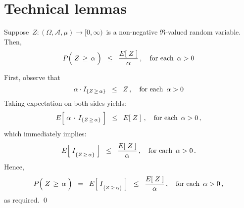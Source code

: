 

\section{Technical lemmas}
\setcounter{theorem}{0}
\setcounter{equation}{0}


\renewcommand{\theenumi}{\roman{enumi}}
\renewcommand{\labelenumi}{\textnormal{(\theenumi)}$\;\;$}


\begin{lemma}
\label{lemma:MarkovInequality}
\mbox{}\vskip 0.2cm
\noindent
Suppose \,$Z : (\Omega,\mathcal{A},\mu) \longrightarrow [0,\infty)$\,
is a non-negative $\Re$-valued random variable.
Then,
\begin{equation*}
P\!\left(\; Z \,\overset{{\color{white}.}}{\geq}\, \alpha \;\right)
\;\; \leq \;\;
	\dfrac{ E\!\left[\; Z \;\right] }{ \alpha }\,,
\quad
\textnormal{for each \,$\alpha > 0$}
\end{equation*}
\end{lemma}
\proof
First, observe that
\begin{equation*}
\alpha \cdot I_{\{Z \,\geq\, \alpha\}} \;\; \leq \;\; Z\,,
\quad
\textnormal{for each \,$\alpha > 0$}
\end{equation*}
Taking expectation on both sides yields:
\begin{equation*}
E\!\left[\; \alpha \overset{{\color{white}-}}{\cdot} I_{\{Z \,\geq\, \alpha\}} \;\right]
\;\; \leq \;\;
	E\!\left[\; Z \;\right]\,,
\quad
\textnormal{for each \,$\alpha > 0$}\,,
\end{equation*}
which immediately implies:
\begin{equation*}
E\!\left[\; I_{\{Z \,\overset{{\color{white}.}}{\geq}\, \alpha\}} \;\right]
\;\; \leq \;\;
	\dfrac{ E\!\left[\; Z \;\right] }{ \alpha }\,,
\quad
\textnormal{for each \,$\alpha > 0$}\,.
\end{equation*}
Hence,
\begin{equation*}
P\!\left(\; Z \,\overset{{\color{white}.}}{\geq}\, \alpha \;\right)
\;\; = \;\;
	E\!\left[\; I_{\{Z \,\overset{{\color{white}.}}{\geq}\, \alpha\}} \;\right]
\;\; \leq \;\;
	\dfrac{ E\!\left[\; Z \;\right] }{ \alpha }\,,
\quad
\textnormal{for each \,$\alpha > 0$}\,,
\end{equation*}
as required.
\qed

